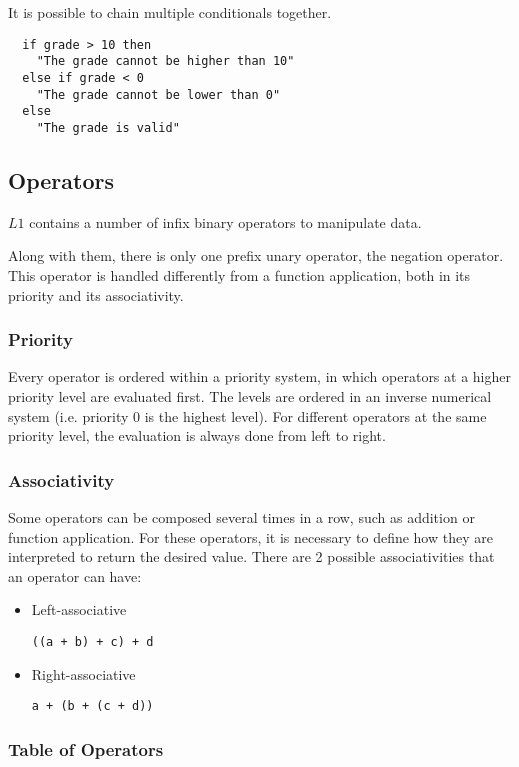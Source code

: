 \documentclass{article}
\def\code#1{\begin{footnotesize}\texttt{#1}\end{footnotesize}}
\begin{document}
It is possible to chain multiple conditionals together.

\begin{lstlisting}
  if grade > 10 then
    "The grade cannot be higher than 10"
  else if grade < 0
    "The grade cannot be lower than 0"
  else
    "The grade is valid"
\end{lstlisting}

\subsection{Operators}

$L1$ contains a number of infix binary operators to manipulate data.

Along with them, there is only one prefix unary operator, the negation operator.
This operator is handled differently from a function application, both in its priority and its associativity.

\subsubsection{Priority}

Every operator is ordered within a priority system, in which operators at a higher priority level are evaluated first.
The levels are ordered in an inverse numerical system (i.e. priority 0 is the highest level).
For different operators at the same priority level, the evaluation is always done from left to right.

\subsubsection{Associativity}

Some operators can be composed several times in a row, such as addition or function application.
For these operators, it is necessary to define how they are interpreted to return the desired value.
There are 2 possible associativities that an operator can have:

\begin{itemize}
  \item Left-associative \\
    \code{((a + b) + c) + d}
  \item Right-associative \\
    \code{a + (b + (c + d))}
\end{itemize}

\subsubsection{Table of Operators}
\end{document}
